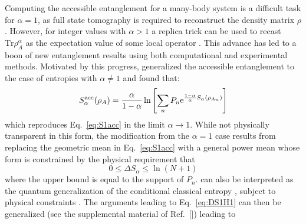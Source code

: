 Computing the accessible entanglement for a many-body system is a difficult task for $\alpha=1$, as full state tomography is required to reconstruct the density matrix $\rho$. However, for integer values with $\alpha > 1$ a replica trick can be used to recast $\mathrm{Tr} \rho_A^\alpha$ as the expectation value of some local operator \cite{Calabrese:2004hl}. This advance has led to a boon of new entanglement results using both computational \cite{Hastings:2010dc, Humeniuk:2012cq, McMinis:2013dp, Herdman:2014ey, Drut:2015fs} and experimental \cite{Daley:2012bd, Islam:2015cm, Kaufman:2016ep, Pichler:2016ec, Linke:2017tf, Lukin:2018wg} methods.  Motivated by this progress, \cite{Barghathi:2018oe} generalized the accessible entanglement to the case of \ren entropies with $\alpha \ne 1$ and found that:
%
\begin{equation}
S_{\alpha}^{{\rm acc}} (\rho_A) = \frac{\alpha}{1-\alpha}\ln\left[ \sum_{n} P_n \mathrm{e}^{\frac{1-\alpha}{\alpha} S_{\alpha}(\rho_{A_n})}\right]
\label{eq:S_alpha_acc}
\end{equation} 
%
which reproduces Eq.~\eqref{eq:S1acc} in the limit $\alpha \to 1$. While not physically transparent in this form, the modification from the $\alpha=1$ case results from replacing the geometric mean in Eq.~\eqref{eq:S1acc} with a general power mean whose form is constrained by the physical requirement that
%
\begin{equation}
 0 \le \Delta S_\alpha \le \ln (N+1)
\label{eq:DeltaS_alpha_inq}
\end{equation}
%
where the upper bound is equal to the support of $P_n$.  can also be interpreted as the quantum generalization of the conditional classical \ren entropy \cite{Cachin97entropymeasures,GolshaniPashaYari:2009,Hayashi:2011,SKORIC:2011el,FehrBerens2014}, subject to physical constraints \cite{Barghathi:2018oe}. The arguments leading to Eq.~\eqref{eq:DS1H1} can then be generalized (see the supplemental material of Ref.~[\cite{Barghathi:2018oe}]) leading to 
